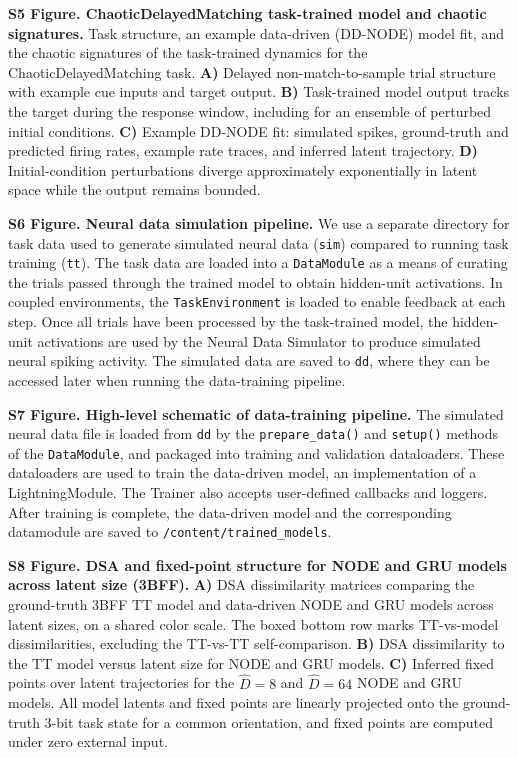 \documentclass{article}
\begin{document}
\noindent\textbf{S5 Figure. ChaoticDelayedMatching task-trained model and chaotic signatures.}
Task structure, an example data-driven (DD-NODE) model fit, and the chaotic signatures of the task-trained dynamics for the ChaoticDelayedMatching task. \textbf{A)} Delayed non-match-to-sample trial structure with example cue inputs and target output. \textbf{B)} Task-trained model output tracks the target during the response window, including for an ensemble of perturbed initial conditions. \textbf{C)} Example DD-NODE fit: simulated spikes, ground-truth and predicted firing rates, example rate traces, and inferred latent trajectory. \textbf{D)} Initial-condition perturbations diverge approximately exponentially in latent space while the output remains bounded.

\noindent\textbf{S6 Figure. Neural data simulation pipeline.}
We use a separate directory for task data used to generate simulated neural data (\texttt{sim}) compared to running task training (\texttt{tt}). The task data are loaded into a \texttt{DataModule} as a means of curating the trials passed through the trained model to obtain hidden-unit activations. In coupled environments, the \texttt{TaskEnvironment} is loaded to enable feedback at each step. Once all trials have been processed by the task-trained model, the hidden-unit activations are used by the Neural Data Simulator to produce simulated neural spiking activity. The simulated data are saved to \texttt{dd}, where they can be accessed later when running the data-training pipeline.

\noindent\textbf{S7 Figure. High-level schematic of data-training pipeline.}
The simulated neural data file is loaded from \texttt{dd} by the \texttt{prepare\_data()} and \texttt{setup()} methods of the \texttt{DataModule}, and packaged into training and validation dataloaders. These dataloaders are used to train the data-driven model, an implementation of a LightningModule. The Trainer also accepts user-defined callbacks and loggers. After training is complete, the data-driven model and the corresponding datamodule are saved to \texttt{/content/trained\_models}.

\noindent\textbf{S8 Figure. DSA and fixed-point structure for NODE and GRU models across latent size (3BFF).}
\textbf{A)} DSA dissimilarity matrices comparing the ground-truth 3BFF TT model and data-driven NODE and GRU models across latent sizes, on a shared color scale. The boxed bottom row marks TT-vs-model dissimilarities, excluding the TT-vs-TT self-comparison. \textbf{B)} DSA dissimilarity to the TT model versus latent size for NODE and GRU models. \textbf{C)} Inferred fixed points over latent trajectories for the $\hat{D}=8$ and $\hat{D}=64$ NODE and GRU models. All model latents and fixed points are linearly projected onto the ground-truth 3-bit task state for a common orientation, and fixed points are computed under zero external input.
\end{document}
